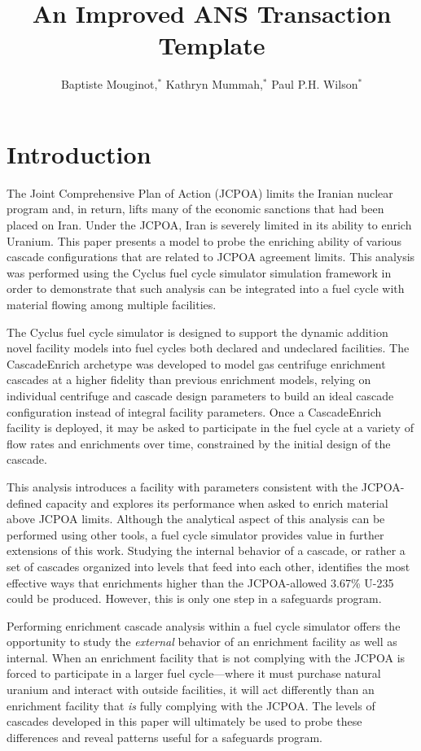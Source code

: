 \documentclass{anstrans}
\title{An Improved ANS Transaction Template}
\author{Baptiste Mouginot,$^{*}$ Kathryn Mummah,$^{*}$ Paul P.H. Wilson$^{*}$}
\institute{
$^{*}$University of Wisconsin-Madison, WI
}
\begin{document}
\section{Introduction}

The Joint Comprehensive Plan of Action (JCPOA)\cite{ref} %
limits the Iranian nuclear program and, in return, lifts many of the economic
sanctions that had been placed on Iran. Under the JCPOA, Iran is severely
limited in its ability to enrich Uranium. This paper presents a model to probe
the enriching ability of various cascade configurations that are related to
JCPOA agreement limits. This analysis was performed using the Cyclus fuel cycle
simulator\cite{ref} %
simulation framework in order to demonstrate that such analysis can be
integrated into a fuel cycle with material flowing among multiple facilities.

The Cyclus fuel cycle simulator is designed to support the dynamic addition
novel facility models into fuel cycles both declared and undeclared facilities.
The CascadeEnrich archetype\cite{ref} was developed to model gas centrifuge
enrichment cascades at a higher fidelity than previous enrichment models,
relying on individual centrifuge and cascade design parameters to build an ideal
cascade configuration instead of integral facility parameters. Once a
CascadeEnrich facility is deployed, it may be asked to participate in the fuel
cycle at a variety of flow rates and enrichments over time, constrained by the
initial design of the cascade.

This analysis introduces a facility with parameters consistent with the
JCPOA-defined capacity and explores its performance when asked to enrich
material above JCPOA limits. Although the analytical aspect of this analysis can
be performed using other tools, a fuel cycle simulator provides value in further
extensions of this work. Studying the internal behavior of a cascade, or rather
a set of cascades organized into levels that feed into each other, identifies
the most effective ways that enrichments higher than the JCPOA-allowed 3.67\%
U-235 could be produced. However, this is only one step in a safeguards program.

Performing enrichment cascade analysis within a fuel cycle simulator offers the
opportunity to study the \textit{external} behavior of an enrichment facility as
well as internal. When an enrichment facility that is not complying with the
JCPOA is forced to participate in a larger fuel cycle---where it must purchase
natural uranium and interact with outside facilities, it will act differently
than an enrichment facility that \textit{is} fully complying with the JCPOA. The
levels of cascades developed in this paper will ultimately be used to probe
these differences and reveal patterns useful for a safeguards program.
\end{document}
